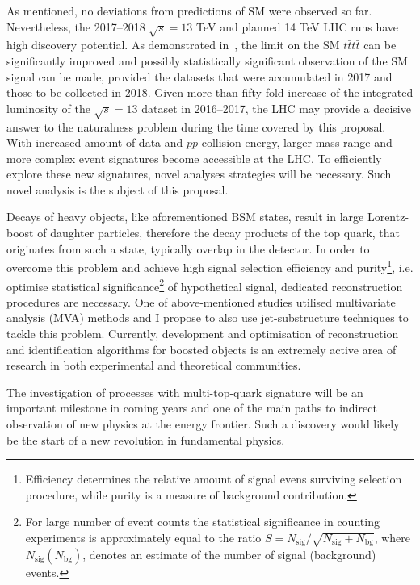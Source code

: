 \textcolor{\mycolor}{
As mentioned, no deviations from predictions of SM were observed so far. Nevertheless, the 2017--2018 $\sqrt{s}=13$ TeV and planned 14 TeV LHC runs have high discovery potential. As demonstrated in~\cite{Sirunyan:2017tep}, the limit on the SM $t\bar{t}t\bar{t}$ can be significantly improved and possibly statistically significant observation of the SM signal can be made, provided the datasets that were accumulated in 2017 and those to be collected in 2018. Given more than fifty-fold increase of the integrated luminosity of the $\sqrt{s}=13$ dataset in 2016--2017, the LHC may provide a decisive answer to the naturalness problem during the time covered by this proposal. With increased amount of data and $pp$ collision energy, larger mass range and more complex event signatures become accessible at the LHC. To efficiently explore these new signatures, novel analyses strategies will be necessary. Such novel analysis is the subject of this proposal.}

\textcolor{\mycolor}{
Decays of heavy objects, like  aforementioned BSM states, result in large Lorentz-boost of daughter particles, therefore the decay products of the top quark, that originates from such a state, typically overlap in the detector. In order to overcome this problem and achieve high signal selection efficiency and purity\footnote{Efficiency determines the relative amount of signal evens surviving selection procedure, while purity is a measure of background contribution.}, i.e. optimise statistical significance\footnote{For large number of event counts the statistical significance in counting experiments is approximately equal to the ratio $S=N_{\mathrm{sig}}/\sqrt{N_{\mathrm{sig}}+N_{\mathrm{bg}}}$, where $N_{\mathrm{sig}}\left(N_{\mathrm{bg}}\right)$, denotes an estimate of the number of signal (background) events.} of hypothetical signal, dedicated reconstruction procedures are necessary. One of above-mentioned studies utilised multivariate analysis (MVA) methods and I propose to also use jet-substructure techniques to tackle this problem. Currently, development and optimisation of reconstruction and identification algorithms for boosted objects is an extremely active area of research in both experimental and theoretical communities.}

\textcolor{\mycolor}{
The investigation of processes with multi-top-quark signature will be an important milestone in coming years and one of the main paths to indirect observation of new physics at the energy frontier. Such a discovery would likely be the start of a new revolution in fundamental physics. }
